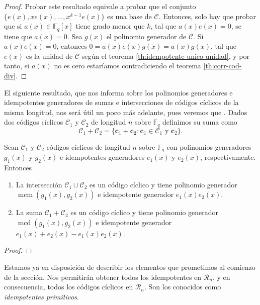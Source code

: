 \begin{proof}
  Probar este resultado equivale a probar que el conjunto \(\{e(x), xe(x), \dots, x^{k-1}e(x)\}\) es una base de \(\mathcal C\).
  Entonces, solo hay que probar que si \(a(x) \in \mathbb F_q[x]\) tiene grado menor que \(k\), tal que \(a(x)e(x) = 0\), se tiene que \(a(x) = 0\).
  Sea \(g(x)\) el polinomio generador de \(\mathcal C\).
  Si \(a(x)e(x) = 0\), entonces \(0 = a(x)e(x)g(x) = a(x)g(x)\), tal que \(e(x)\) es la unidad de \(\mathcal C\) según el teorema \ref{th:idempotente-unico-unidad}, y por tanto, si \(a(x)\) no es cero estaríamos contradiciendo el teorema \ref{th:corr-cod-div}.
\end{proof}

El siguiente resultado, que nos informa sobre los polinomios generadores e idempotentes generadores de sumas e intersecciones de códigos cíclicos de la misma longitud, nos será útil un poco más adelante, pues veremos que .
Dados dos códigos cíclicos \(\mathcal C_1\) y \(\mathcal C_2\) de longitud \(n\) sobre \(\mathbb F_q\) definimos su suma como
\[
  \mathcal C_1 + \mathcal C_2 = \{\mathbf{c}_1 + \mathbf{c_2} : \mathbf{c}_1 \in \mathcal C_1 \text{ y } \mathbf{c}_2\}.
\]

\begin{theorem}
  Sean \(\mathcal C_1\) y \(\mathcal C_2\) códigos cíclicos de longitud \(n\) sobre \(\mathbb F_q\) con polinomios generadores \(g_1(x)\) y \(g_2(x)\) e idempotentes generadores \(e_1(x)\) y \(e_2(x)\), respectivamente.
  Entonces \begin{enumerate}
    \item La intersección \(\mathcal C_1 \cup \mathcal C_2\) es un código cíclico y tiene polinomio generador \(\operatorname{mcm}(g_1(x), g_2(x))\) e idempotente generador \(e_1(x)e_2(x)\).
    \item La suma \(\mathcal C_1 + \mathcal C_2\) es un código cíclico y tiene polinomio generador \(\operatorname{mcd}(g_1(x), g_2(x))\) e idempotente generador \(e_1(x) + e_2(x) - e_1(x)e_2(x)\).
  \end{enumerate}
\end{theorem}

\begin{proof}
  
\end{proof}

Estamos ya en disposición de describir los elementos que prometimos al comienzo de la sección.
Nos permitirán obtener todos los idempotentes en \(\mathcal R_n\), y en consecuencia, todos los códigos cíclicos en \(\mathcal R_n\).
Son los conocidos como \emph{idempotentes primitivos}.

